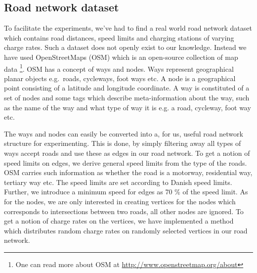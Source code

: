 \subsection{Road network dataset} 
\label{sub:setup}
To facilitate the experiments, we've had to find a real world road network dataset which contains road distances, speed limits and charging stations of varying charge rates. Such a dataset does not openly exist to our knowledge. Instead we have used OpenStreetMaps (OSM) which is an open-source collection of map data \footnote{One can read more about OSM at \url{http://www.openstreetmap.org/about}}. OSM has a concept of ways and nodes. Ways represent geographical planar objects e.g.\ roads, cycleways, foot ways etc. A node is a geographical point consisting of a latitude and longitude coordinate. A way is constituted of a set of nodes and some tags which describe meta-information about the way, such as the name of the way and what type of way it is e.g. a road, cycleway, foot way  etc. 

The ways and nodes can easily be converted into a, for us, useful road network structure for experimenting. This is done, by simply filtering away all types of ways accept roads and use these as edges in our road network. To get a notion of speed limits on edges, we derive general speed limits from the type of the roads. OSM carries such information as whether the road is a motorway, residential way, tertiary way etc. The speed limits are set according to Danish speed limits. Further, we introduce a minimum speed for edges as 70 \% of the speed limit. As for the nodes, we are only interested in creating vertices for the nodes which corresponds to intersections between two roads, all other nodes are ignored. To get a notion of charge rates on the vertices, we have implemented a method which distributes random charge rates on randomly selected vertices in our road network.

